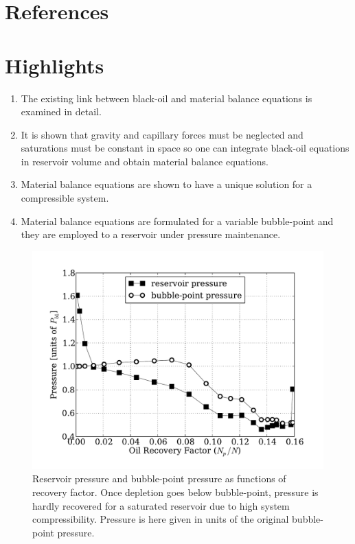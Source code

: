 \documentclass[authoryear,preprint,review,12pt]{elsarticle}
\begin{document}
\section*{References}


\cite{*}

\section*{Highlights}
\begin{enumerate}[1.]
\item The existing link between black-oil and material balance equations is examined in detail.
\item It is shown that gravity and capillary forces must be neglected and saturations must be constant in space so one can integrate black-oil equations in reservoir volume and obtain material balance equations.
\item Material balance equations are shown to have a unique solution for a compressible system.
\item Material balance equations are formulated for a variable bubble-point and they are employed to a reservoir under pressure maintenance.
\end{enumerate}

\pagebreak

\begin{figure}
\centering
\includegraphics[width=\linewidth]{./python/matbal_p}
\caption{Reservoir pressure and bubble-point pressure as functions of recovery factor. Once depletion goes below bubble-point, pressure is hardly recovered for a saturated reservoir due to high system compressibility. Pressure is here given in units of the original bubble-point pressure.}
\label{fig: matbal_p}
\end{figure}
\end{document}
